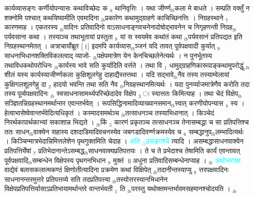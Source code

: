 \documentclass[article,12pt,a4paper]{memoir}%
\newcommand{\quotelemma}[1]{\textcolor{cyan}{#1}}
\newcounter{parCount}
\begin{document}
	  
	  \pstart \leavevmode%
	कार्यव्यासङ्गः कर्णीयोपन्यासः कथाविच्छेदः क {\tiny $_{6}$} थानिवृत्तिः । यथा जीर्ण्ण{\tiny $_{lb}$}कला मे बाधते । सम्प्रति वक्तुँ न शक्नोमि पश्चात् कथयिष्यामीति एवमादिना {\tiny $_{lb}$}प्रकारेण कथामुद्ग्राहणे काचिच्छिनत्तिः । निग्रहस्थाने {\tiny $_{7}$} कारणमाह । एकतरस्य {\tiny $_{lb}$}वादिनः प्रतिवादिनो वाऽसाधनाङ्गवचनेनादोषोद्भावनेन च निगृहणन्ती निग्रह{\tiny $_{lb}$}पर्यवसाना कथा । तस्याञ्च तथाभूतायां प्रस्तुता {\tiny $_{8}$} यां स स्वयमेव कथांतं कथा {\tiny $_{lb}$}पर्यवसानं प्रतिपद्यत इति निग्रहस्थानमेतत् । अत्राचार्योब्रूत [।] इदमपि कार्यव्यास{\tiny $_{lb}$}ञ्जनं यदि तावत् पूर्वपक्षवादी कुर्यात् {\tiny $_{9}$} \leavevmode{} साधनाभिधानशक्तिविकलत्वाद् व्याजो- {\tiny $_{lb}$}पक्षेपमात्रेण येन केनचिच्छलेनेत्यर्थः । न पुनर्भूतस्य तथाविधकथोपरोधिनः {\tiny $_{lb}$}कार्यस्य भावे सति कुर्यादिति वर्त्तते । तथा वि {\tiny $_{1}$} धामुद्ग्राहणिकारूपाङ्कथामुपरोद्धुं {\tiny $_{lb}$}शीलं यस्य कार्यस्याजीर्ण्णकला कुक्षिशूलगेहु  दाहाद्यैस्तत्तथा । यदि सद्भावे{\tiny $_{lb}$}नैव तस्य तस्याम्वेलायां कुक्षिगलशूलगेहु  दा {\tiny $_{2}$} हादयो भवन्ति तथा सति नैव {\tiny $_{lb}$}निग्रहस्थानमित्यर्थः । यदा पुनर्व्याजमात्रेणैव करोति तदा तस्य पूर्व्वपक्षवादिनः {\tiny $_{lb}$} \leavevmode{} स्वसाधनासामर्थ्यपरिच्छेदादेव विक्षेप {\tiny $_{3}$} ः स्यात्ततः किमित्याह । तथा चेदं विक्षेप{\tiny $_{lb}$}सञ्ज्ञितन्निग्रहस्थानमर्थान्तर एवान्तर्भवेत् । रूपसिद्धिनामादिव्याख्यानसमान{\tiny $_{lb}$}त्त्वात् करणीयोपन्यास {\tiny $_{4}$} स्य । हेत्वाभासेष्वेवान्तर्भवेदित्यधिकृतं । कस्मादसमर्थञ्च {\tiny $_{lb}$}तत्साधनञ्च तस्याभिधानात् । किञ्चेदं निरर्थकापार्थकाभ्यां सकाशान्न भिद्यते । {\tiny $_{lb}$}किं {\tiny $_{5}$} कारणं प्रकृतञ्च तत्साधनञ्च तेनासम्बद्धा च सा प्रतिपत्तिश्च ततः साधन{\tiny $_{lb}$}वाक्येन सहास्य दशदाडिमादिवचनस्येव जबगडादिवर्ण्णक्रमस्येव च {\tiny $_{6}$} सम्बद्धानुप{\tiny $_{lb}$}लम्भादित्यर्थः । किञ्चिन्मात्रभेदान्निमित्तलेशेन पृथगुक्तमिति चेदाह । \quotelemma{अति {\tiny $_{lb}$}प्रसङ्गश्चे} त्यादि । असम्बद्धासाधनवाक्येन प्रतिपत्तिर्येषां {\tiny $_{7}$} प्रतिभेदानान्तेऽसम्बद्ध{\tiny $_{lb}$}साधनवाक्यप्रतिपत्तयः । ते च ते प्रभेदाश्च तेषामिति कार्यं एवन्तावत् पूर्वपक्षवादि{\tiny $_{lb}$}सम्बन्धेन विक्षेपस्य पृथगनभिधान {\tiny $_{8}$} मुक्तं ॥ अधुना प्रतिवादिसम्बन्धेनाप्याह । {\tiny $_{lb}$} \quotelemma{अथोत्तरपक्ष} वाद्येवं बलासकलात्मकण्ठं क्षिणोतीत्यादिना प्रक्रमेण कथां विक्षिपेत् {\tiny $_{lb}$}तदानीन्तस्याप्यु {\tiny $_{9}$} \leavevmode{} त्तरपक्षवादिनः साधनानन्तरमुत्तरे प्रतिपत्तव्ये सति तदप्रतिपत्त्या {\tiny $_{lb}$}तस्योत्तरस्यानभिधानेन विक्षेपप्रतिपत्तिर्यासाऽप्रतिभायामर्थान्तरे वान्तर्भवती {\tiny $_{1}$} ति {\tiny $_{lb}$}परस्तु यथोक्तमन्तर्भावमसहमानश्चोदयति ।
	{}
	\pend%
      {\tiny $_{lb}$}
\end{document}
